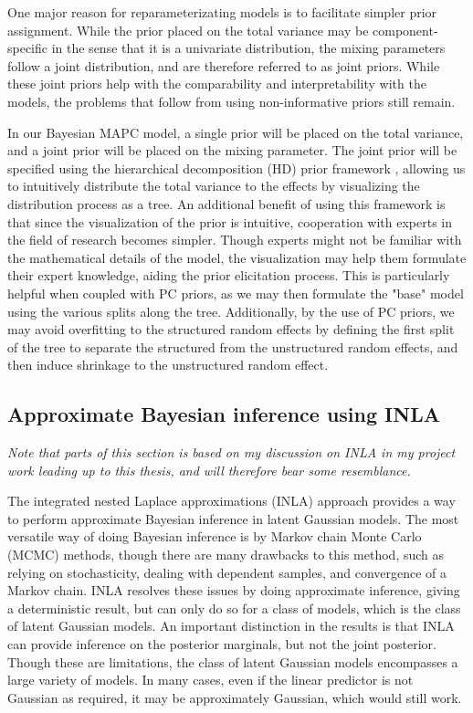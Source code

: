 One major reason for reparameterizating models is to facilitate simpler prior assignment. While the prior placed on the total variance may be component-specific in the sense that it is a univariate distribution, the mixing parameters follow a joint distribution, and are therefore referred to as joint priors. While these joint priors help with the comparability and interpretability with the models, the problems that follow from using non-informative priors still remain. 

In our Bayesian MAPC model, a single prior will be placed on the total variance, and a joint prior will be placed on the mixing parameter. The joint prior will be specified using the hierarchical decomposition (HD) prior framework \citep{Jointprior}, allowing us to intuitively distribute the total variance to the effects by visualizing the distribution process as a tree. An additional benefit of using this framework is that since the visualization of the prior is intuitive, cooperation with experts in the field of research becomes simpler. Though experts might not be familiar with the mathematical details of the model, the visualization may help them formulate their expert knowledge, aiding the prior elicitation process. This is particularly helpful when coupled with PC priors, as we may then formulate the "base" model using the various splits along the tree. Additionally, by the use of PC priors, we may avoid overfitting to the structured random effects by defining the first split of the tree to separate the structured from the unstructured random effects, and then induce shrinkage to the unstructured random effect. 

\subsection{Approximate Bayesian inference using INLA}
\label{section:INLA}
\textit{Note that parts of this section is based on my discussion on INLA in my project work \citep{Prosjektoppgave} leading up to this thesis, and will therefore bear some resemblance.}

The integrated nested Laplace approximations (INLA) approach \citep{Original-INLA} provides a way to perform approximate Bayesian inference in latent Gaussian models. The most versatile way of doing Bayesian inference is by Markov chain Monte Carlo (MCMC) methods, though there are many drawbacks to this method, such as relying on stochasticity, dealing with dependent samples, and convergence of a Markov chain. INLA resolves these issues by doing approximate inference, giving a deterministic result, but can only do so for a class of models, which is the class of latent Gaussian models. An important distinction in the results is that INLA can provide inference on the posterior marginals, but not the joint posterior. Though these are limitations, the class of latent Gaussian models encompasses a large variety of models. In many cases, even if the linear predictor is not Gaussian as required, it may be approximately Gaussian, which would still work.

